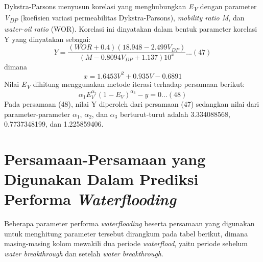 \documentclass[
]{book}
\begin{document}
Dykstra-Parsons menyusun korelasi yang menghubungkan \emph{E\textsubscript{V}} dengan parameter \emph{V\textsubscript{DP}} (koefisien variasi permeabilitas Dykstra-Parsons), \emph{mobility ratio M}, dan \emph{water-oil ratio} (WOR). Korelasi ini dinyatakan dalam bentuk parameter korelasi Y yang dinyatakan sebagai:
\[Y = \frac{(WOR+0.4)(18.948 - 2.499V_{DP})}{(M - 0.8094V_{DP}+1.137)10^x} ...(47)\]
dimana
\[x = 1.6453V^2 + 0.935V - 0.6891\]
Nilai \emph{E\textsubscript{V}} dihitung menggunakan metode iterasi terhadap persamaan berikut:
\[\alpha_1E_V^{\alpha_2}(1-E_V)^{\alpha_3} - y = 0 ...(48)\]
Pada persamaan (48), nilai Y diperoleh dari persamaan (47) sedangkan nilai dari parameter-parameter \(\alpha_1\), \(\alpha_2\), dan \(\alpha_3\) berturut-turut adalah 3.334088568, 0.7737348199, dan 1.225859406.

\hypertarget{persamaan-persamaan-yang-digunakan-dalam-prediksi-performa-waterflooding}{%
\section{\texorpdfstring{Persamaan-Persamaan yang Digunakan Dalam Prediksi Performa \emph{Waterflooding}}{Persamaan-Persamaan yang Digunakan Dalam Prediksi Performa Waterflooding}}\label{persamaan-persamaan-yang-digunakan-dalam-prediksi-performa-waterflooding}}

Beberapa parameter performa \emph{waterflooding} beserta persamaan yang digunakan untuk menghitung parameter tersebut dirangkum pada tabel berikut, dimana masing-masing kolom mewakili dua periode \emph{waterflood}, yaitu periode sebelum \emph{water breakthrough} dan setelah \emph{water breakthrough}.
\end{document}
